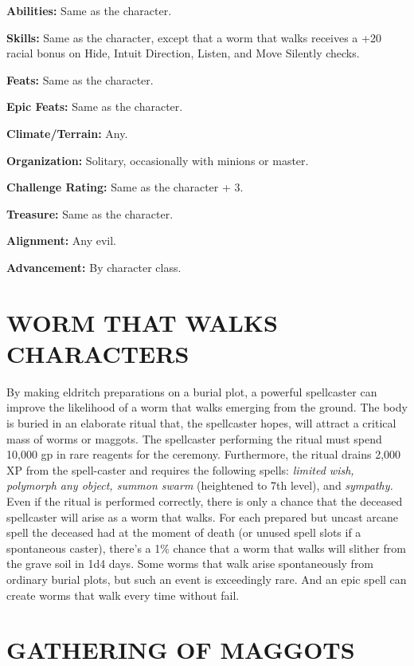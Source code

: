 \documentclass{article}
\begin{document}
{\textbf{Abilities:} Same as the character. 

\textbf{Skills:} Same as the character, except that a worm that walks receives 
a +20 racial bonus on Hide, Intuit Direction, Listen, and Move Silently checks. 

\textbf{Feats: }Same as the character. 

\textbf{Epic Feats: }Same as the character. 

\textbf{Climate/Terrain:} Any. 

\textbf{Organization:} Solitary, occasionally with minions or master. 

\textbf{Challenge Rating:} Same as the character + 3. 

\textbf{Treasure: }Same as the character. 

\textbf{Alignment:} Any evil. 

\textbf{Advancement:} By character class. 

\vspace{12pt}
\section*{WORM THAT WALKS CHARACTERS }

By making eldritch preparations on a burial plot, a powerful spellcaster can improve 
the likelihood of a worm that walks emerging from the ground. The body is buried 
in an elaborate ritual that, the spellcaster hopes, will attract a critical mass 
of worms or maggots. The spellcaster performing the ritual must spend 10,000 gp 
in rare reagents for the ceremony. Furthermore, the ritual drains 2,000 XP from 
the spell-caster and requires the following spells: \textit{limited wish, polymorph 
any object, summon swarm }(heightened to 7th level),\textit{ }and \textit{sympathy. 
}Even if the ritual is performed correctly, there is only a chance that the deceased 
spellcaster will arise as a worm that walks. For each prepared but uncast arcane 
spell the deceased had at the moment of death (or unused spell slots if a spontaneous 
caster), there's a 1\% chance that a worm that walks will slither from the grave 
soil in 1d4 days. Some worms that walk arise spontaneously from ordinary burial 
plots, but such an event is exceedingly rare. And an epic spell can create worms 
that walk every time without fail. 

\vspace{12pt}
\section*{GATHERING OF MAGGOTS }

}
\end{document}
